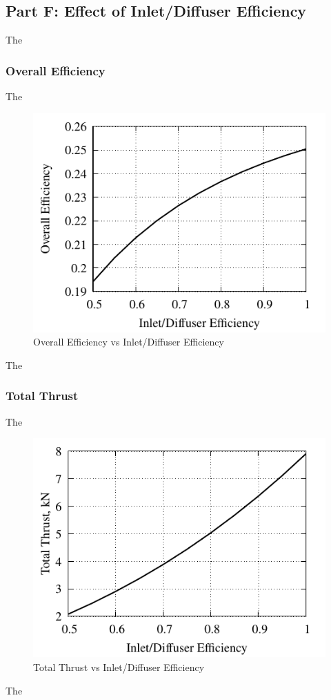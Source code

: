 \documentclass[conf]{new-aiaa} %
\begin{document}
\subsection{Part F: Effect of Inlet/Diffuser Efficiency}
The

\subsubsection{Overall Efficiency}
The

\begin{figure}[hbt!] %
    \centering
    \includegraphics[]{media/performance_parameter_files/part_f_eta_o.pdf}
    \caption{\label{fig:partfetao}Overall Efficiency vs Inlet/Diffuser Efficiency}
\end{figure}
The

\subsubsection{Total Thrust}
The

\begin{figure}[hbt!] %
    \centering
    \includegraphics[]{media/performance_parameter_files/part_f_T.pdf}
    \caption{\label{fig:partft}Total Thrust vs Inlet/Diffuser Efficiency}
\end{figure}
The
\end{document}
